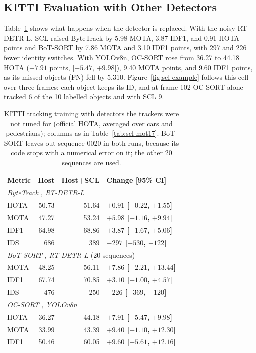 \subsection{KITTI Evaluation with Other Detectors}\label{sec:scl-res-kitti}
Table~\ref{tab:scl-kitti} shows what happens when the detector is replaced. With the noisy RT-DETR-L, SCL raised ByteTrack by 5.98 MOTA, 3.87 IDF1, and 0.91 HOTA points and BoT-SORT by 7.86 MOTA and 3.10 IDF1 points, with 297 and 226 fewer identity switches. With YOLOv8n, OC-SORT rose from 36.27 to 44.18 HOTA ($+7.91$ points, [$+5.47$, $+9.98$]), 9.40 MOTA points, and 9.60 IDF1 points, as its missed objects (FN) fell by 5,310. Figure~\ref{fig:scl-example} follows this cell over three frames: each object keeps its ID, and at frame 102 OC-SORT alone tracked 6 of the 10 labelled objects and with SCL 9.

\begin{table}[tbp]
\centering
\caption{KITTI tracking training with detectors the trackers were not tuned for (official HOTA, averaged over cars and pedestrians); columns as in Table~\ref{tab:scl-mot17}. BoT-SORT leaves out sequence 0020 in both runs, because its code stops with a numerical error on it; the other 20 sequences are used.}
\label{tab:scl-kitti}
\begin{tabular}{lrrl}
\toprule
Metric & Host & Host+SCL & Change [95\% CI]\\
\midrule
\multicolumn{4}{l}{\textit{ByteTrack} \cite{zhang2022bytetrack}\textit{, RT-DETR-L}}\\
\quad HOTA & 50.73 & 51.64 & \textbf{$+0.91$ [$+0.22$, $+1.55$]}\\
\quad MOTA & 47.27 & 53.24 & \textbf{$+5.98$ [$+1.16$, $+9.94$]}\\
\quad IDF1 & 64.98 & 68.86 & \textbf{$+3.87$ [$+1.67$, $+5.06$]}\\
\quad IDS & 686 & 389 & \textbf{$-297$ [$-530$, $-122$]}\\
\multicolumn{4}{l}{\textit{BoT-SORT} \cite{aharon2022botsort}\textit{, RT-DETR-L} (20 sequences)}\\
\quad MOTA & 48.25 & 56.11 & \textbf{$+7.86$ [$+2.21$, $+13.44$]}\\
\quad IDF1 & 67.74 & 70.85 & \textbf{$+3.10$ [$+1.00$, $+4.57$]}\\
\quad IDS & 476 & 250 & \textbf{$-226$ [$-369$, $-120$]}\\
\multicolumn{4}{l}{\textit{OC-SORT} \cite{cao2023ocsort}\textit{, YOLOv8n}}\\
\quad HOTA & 36.27 & 44.18 & \textbf{$+7.91$ [$+5.47$, $+9.98$]}\\
\quad MOTA & 33.99 & 43.39 & \textbf{$+9.40$ [$+1.10$, $+12.30$]}\\
\quad IDF1 & 50.46 & 60.05 & \textbf{$+9.60$ [$+5.61$, $+12.16$]}\\
\bottomrule
\end{tabular}
\end{table}

